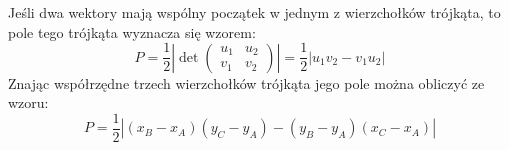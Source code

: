 \documentclass[14pt,a4paper]{extarticle}
\newcommand{\verts}[1]{\left\lvert#1\right\rvert}
\begin{document}
\hfill\break
Jeśli dwa wektory mają wspólny początek w jednym z wierzchołków trójkąta, to pole tego
trójkąta wyznacza się wzorem:
$$P=\dfrac{1}{2}\verts{\det\begin{pmatrix}u_{1}&u_{2}\\v_{1}&v_{2}\end{pmatrix}} = \dfrac{1}{2}\verts{u_{1}v_{2}-v_{1}u_{2}}$$
\MoveBelowBox
\noindent Znając współrzędne trzech wierzchołków trójkąta jego pole można obliczyć ze wzoru:
$$P=\dfrac{1}{2}\verts{(x_{B}-x_{A})(y_{C}-y_{A})-(y_{B}-y_{A})(x_{C}-x_{A})}$$
\end{document}
